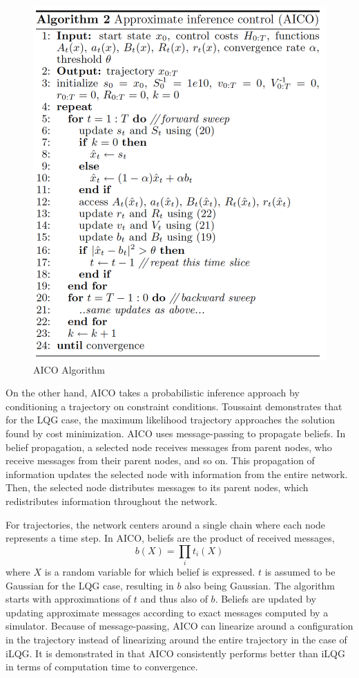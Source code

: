 \documentclass[12pt]{article}
\begin{document}
            \begin{figure}
                \centering
                \includegraphics[width=0.45\linewidth]{images/algorithms/aico.png}
                \caption{AICO Algorithm \protect\cite{toussaint_robot_2009}}
                \label{fig:aico}
            \end{figure}

            \par On the other hand, AICO takes a probabilistic inference approach by conditioning a trajectory on constraint conditions. Toussaint demonstrates that for the LQG case, the maximum likelihood trajectory approaches the solution found by cost minimization. AICO uses message-passing to propagate beliefs. In belief propagation, a selected node receives messages from parent nodes, who receive messages from their parent nodes, and so on. This propagation of information updates the selected node with information from the entire network. Then, the selected node distributes messages to its parent nodes, which redistributes information throughout the network. \cite{minka_expectation_nodate}
            \par For trajectories, the network centers around a single chain where each node represents a time step. In AICO, beliefs are the product of received messages,
            \begin{equation}
                b(X)=\prod_{i}t_{i}(X)
            \end{equation}
            where $X$ is a random variable for which belief is expressed. $t$ is assumed to be Gaussian for the LQG case, resulting in $b$ also being Gaussian. The algorithm starts with approximations of $t$ and thus also of $b$. Beliefs are updated by updating approximate messages according to exact messages computed by a simulator.
            Because of message-passing, AICO can linearize around a configuration in the trajectory instead of linearizing around the entire trajectory in the case of iLQG.\cite{toussaint_robot_2009} It is demonstrated in \cite{toussaint_robot_2009} that AICO consistently performs better than iLQG in terms of computation time to convergence.
\end{document}
